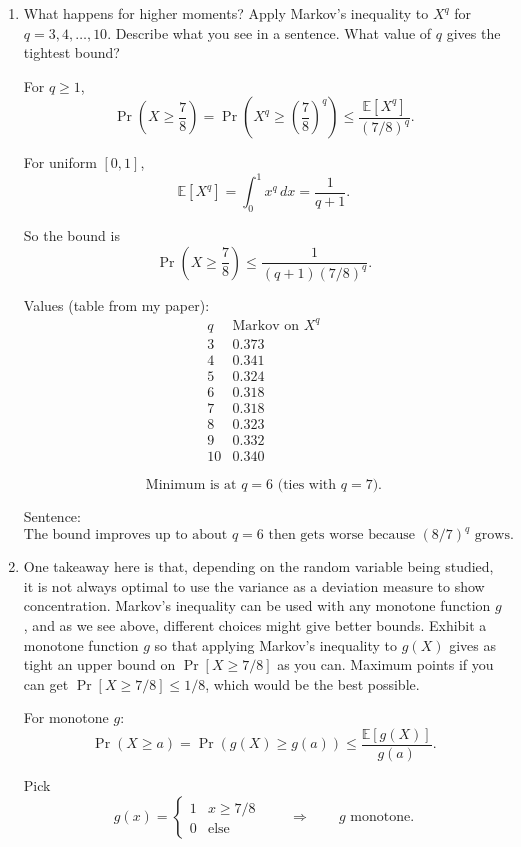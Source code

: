 \documentclass[10pt]{article}
\newcommand{\spara}[1]{\vspace{.5em}\noindent {\large\sffamily\textcolor{nyuOfficialPurple}{#1}}}
\newcommand{\E}{\mathbb{E}}
\begin{document}
\begin{enumerate}[label=\arabic*.]
\[
\boxed{\Pr[X\ge 7/8]\le \frac{64}{147}.}
\]


	\item What happens for higher moments? Apply Markov's inequality to $X^q$ for $q = 3,4,\ldots,10$. Describe what you see in a sentence. What value of $q$ gives the tightest bound?

\spara{Pr. 1.4}

For $q\ge 1$,
\[
\Pr\!\left(X\ge \frac{7}{8}\right)
=
\Pr\!\left(X^q \ge \left(\frac{7}{8}\right)^q\right)
\le
\frac{\E[X^q]}{(7/8)^q}.
\]

For uniform $[0,1]$,
\[
\E[X^q]=\int_0^1 x^q\,dx=\frac{1}{q+1}.
\]

So the bound is
\[
\Pr\!\left(X\ge \frac{7}{8}\right)\le
\frac{1}{(q+1)(7/8)^q}.
\]

Values (table from my paper):
\[
\begin{array}{c|c}
q & \text{Markov on }X^q \\
\hline
3 & 0.373\\
4 & 0.341\\
5 & 0.324\\
6 & 0.318\\
7 & 0.318\\
8 & 0.323\\
9 & 0.332\\
10 & 0.340
\end{array}
\]

\[
\boxed{\text{Minimum is at } q=6 \text{ (ties with } q=7\text{).}}
\]

Sentence:
\[
\text{The bound improves up to about }q=6\text{ then gets worse because }(8/7)^q\text{ grows.}
\]


	\item One takeaway here is that, depending on the random variable being studied, it is not always optimal to use the variance as a deviation measure to show concentration. Markov's inequality can be used with any monotone function $g$, and as we see above, different choices might give better bounds. Exhibit a monotone function $g$ so that applying Markov's inequality to $g(X)$ gives as tight an upper bound on $\Pr[X \geq 7/8]$ as you can. Maximum points if you can get $\Pr[X \geq 7/8] \leq 1/8$, which would be the best possible.

\spara{Pr. 1.5}

For monotone $g$:
\[
\Pr(X\ge a)=\Pr(g(X)\ge g(a))\le \frac{\E[g(X)]}{g(a)}.
\]

Pick
\[
g(x)=
\begin{cases}
1 & x\ge 7/8\\
0 & \text{else}
\end{cases}
\qquad\Rightarrow\qquad
g \text{ monotone.}
\]


\end{enumerate}
\end{document}
